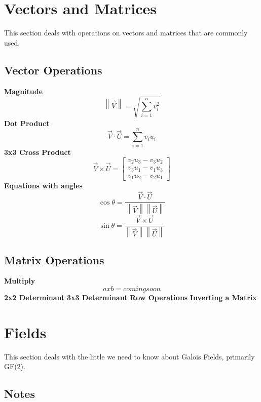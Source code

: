 \section{Vectors and Matrices}
This section deals with operations on vectors and matrices that are commonly used.
\subsection{Vector Operations}
	\textbf{Magnitude}
	\begin{equation}
	\left\|   \vec{V} \right\|  = \sqrt{\sum_{i=1}^{n} v_i^2}
	\end{equation}
	\textbf{Dot Product}
	\begin{equation}
	\vec{V} \cdot \vec{U} = \sum_{i=1}^{n} v_iu_i
	\end{equation}
	\textbf{3x3 Cross Product}
\begin{equation}
	\vec{V} \times \vec{U} = \begin{bmatrix}
		v_2u_3 - v_3u_2\\ 
		v_3u_1 - v_1u_3\\ 
		v_1u_2 - v_2u_1
	\end{bmatrix}
\end{equation}
	\textbf{Equations with angles}
		\begin{equation}
		\cos{\theta} = \frac{\vec{V} \cdot \vec{U}}{\left\| \vec{V} \right\| \left\| \vec{U} \right\| }
		\end{equation}
		\begin{equation}
		\sin{\theta} = \frac{\vec{V} \times \vec{U}}{\left\| \vec{V} \right\| \left\| \vec{U} \right\| }
		\end{equation}
\subsection{Matrix Operations}
\textbf{Multiply}
\begin{equation}
a x b = coming soon
\end{equation}
\textbf{2x2 Determinant}
\textbf{3x3 Determinant}
\textbf{Row Operations}
\textbf{Inverting a Matrix}

\section{Fields}
This section deals with the little we need to know about Galois Fields, primarily GF(2).
\subsection{Notes}
